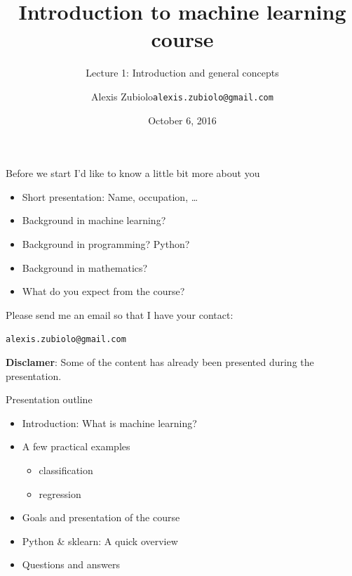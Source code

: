 \documentclass{beamer}
\title[Course presentation]{Introduction to machine learning course}
\subtitle{Lecture 1: Introduction and general concepts}
\author{Alexis Zubiolo\newline\texttt{alexis.zubiolo@gmail.com}}
\institute{Data Science Team Lead @ Adcash}
\date{October 6, 2016}
\begin{document}
\begin{frame}
  \titlepage
\end{frame}


\begin{frame}{Before we start}
\vfill
I'd like to know a little bit more about you
\vfill
\begin{itemize}
	\item Short presentation: Name, occupation, \ldots
	\item Background in machine learning?
	\item Background in programming? Python?
	\item Background in mathematics?
	\item What do you expect from the course?
\end{itemize}
\vfill
Please send me an email so that I have your contact:
\vfill
\begin{center}
\texttt{alexis.zubiolo@gmail.com}
\end{center}
\vfill
\end{frame}

\begin{frame}
\textbf{Disclamer}: Some of the content has already been presented during 
the presentation.
\end{frame}

\begin{frame}{Presentation outline}

\vfill
\begin{itemize}
  \item Introduction: What is machine learning?
\vfill
  \item A few practical examples
  \begin{itemize}
  	\item classification
  	\item regression
  \end{itemize}
\vfill
  \item Goals and presentation of the course 
\vfill
  \item Python \& sklearn: A quick overview
\vfill
  \item Questions and answers
\end{itemize}
\vfill

\end{frame}
\end{document}
